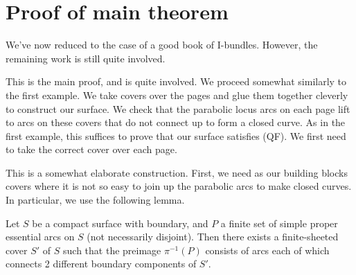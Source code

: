 \section{Proof of main theorem}

We've now reduced to the case of a good book of I-bundles. However, the
remaining work is still quite involved.

This is the main proof, and is quite involved. We proceed somewhat similarly to
the first example. We take covers over the pages and glue them together
cleverly to construct our surface. We check that the parabolic locus arcs on
each page lift to arcs on these covers that do not connect up to form a closed
curve. As in the first example, this suffices to prove that our surface
satisfies (QF). We first need to take the correct cover over each page.

This is a somewhat elaborate construction. First, we need as our building
blocks covers where it is not so easy to join up the parabolic arcs to make
closed curves. In particular, we use the following lemma.

\begin{lemma}

Let $S$ be a compact surface with boundary, and $P$ a finite set of simple
proper essential arcs on $S$ (not necessarily disjoint).  Then there exists
a finite-sheeted cover $S'$ of $S$ such that the preimage $\pi^{-1}(P)$
consists of arcs each of which connects 2 different boundary components of
$S'$.

\end{lemma}

